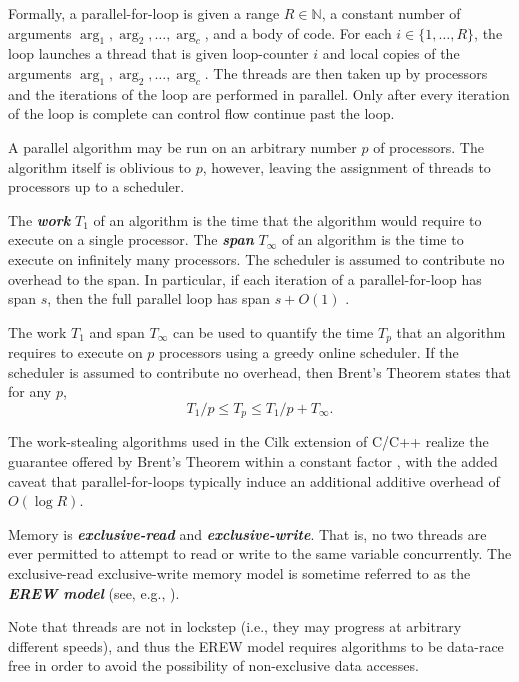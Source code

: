 \documentclass[sigplan, 10pt, nonacm]{acmart}
\newcommand{\defn}[1]{{\textit{\textbf{\boldmath #1}}}}
\renewcommand{\paragraph}[1]{\vspace{0.09in}\noindent{\bf \boldmath #1.}}
\theoremstyle{remark}
\theoremstyle{remark}
\begin{document}
Formally, a parallel-for-loop is given a range $R \in \mathbb{N}$, a
constant number of arguments $\arg_1, \arg_2, \ldots, \arg_c$, and a
body of code. For each $i \in \{1, \ldots, R\}$, the loop launches a
thread that is given loop-counter $i$ and local copies of the
arguments $\arg_1, \arg_2, \ldots, \arg_c$. The threads are then taken up by processors and the iterations of the loop are performed in parallel. Only after every iteration of the loop is complete can control flow continue past the loop.

A parallel algorithm may be run on an arbitrary number $p$ of
processors. The algorithm itself is oblivious to $p$, however, leaving
the assignment of threads to processors up to a scheduler.

The \defn{work} $T_1$ of an algorithm is the time that the algorithm
would require to execute on a single processor. The \defn{span}
$T_\infty$ of an algorithm is the time to execute on infinitely many
processors. The scheduler is assumed to contribute no overhead to the
span. In particular, if each iteration of a
parallel-for-loop has span $s$, then the full parallel loop has span
$s + O(1)$ \cite{Blelloch96,AcarBl16}.

The work $T_1$ and span $T_\infty$ can be used to quantify the time $T_p$
that an algorithm requires to execute on $p$ processors using a greedy
online scheduler. If the scheduler is assumed to contribute no
overhead, then Brent's Theorem \cite{Brent74} states that for any
$p$,
$$T_1 / p \le T_p \le T_1 / p + T_\infty.$$

The work-stealing algorithms used in the Cilk extension of C/C++ realize
the guarantee offered by Brent's Theorem within a constant factor
\cite{BlumofeJo96,BlumofeLe99}, with the added caveat that parallel-for-loops typically induce an additional additive overhead of $O(\log
R)$. 

\paragraph{Memory Model} Memory is \defn{exclusive-read} and \defn{exclusive-write}. That is, no two threads are ever permitted to attempt to read or write to the same variable concurrently. 
The exclusive-read exclusive-write memory model is sometime referred
to as the \defn{EREW model} (see, e.g., \cite{Hagerup89}).

Note that threads are not in lockstep (i.e., they may progress at arbitrary
different speeds), and thus the EREW model requires algorithms to be data-race
free in order to avoid the possibility of non-exclusive data accesses.
\end{document}
